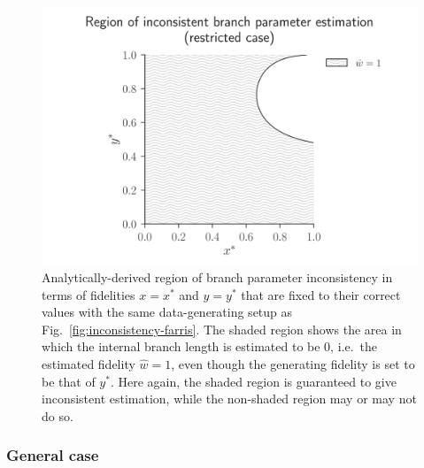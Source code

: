 \documentclass{article}
\begin{document}
\begin{figure}
\centering
\includegraphics[width=\textwidth]{branch-length-inconsistency-inkscape}
\caption{Analytically-derived region of branch parameter inconsistency in terms of fidelities $x=x^*$ and $y=y^*$ that are fixed to their correct values with the same data-generating setup as Fig.~\ref{fig:inconsistency-farris}.
The shaded region shows the area in which the internal branch length is estimated to be 0, i.e.\ the estimated fidelity $\hat{w} = 1$, even though the generating fidelity is set to be that of $y^*$.
Here again, the shaded region is guaranteed to give inconsistent estimation, while the non-shaded region may or may not do so.}
\label{fig:bl-inconsistency}
\end{figure}

\subsubsection*{General case}
\end{document}
